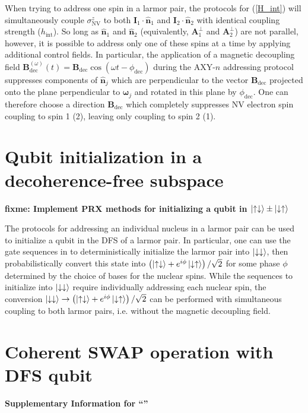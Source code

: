 \documentclass[twocolumn]{revtex4-1}
\renewcommand{\t}{\text} %
\newcommand{\p}[1]{\left(#1\right)} %
\renewcommand{\v}{\bm} %
\newcommand{\uv}[1]{\hat{\v{#1}}} %
\renewcommand{\c}{\cdot} %
\renewcommand{\u}{\uparrow}
\renewcommand{\d}{\downarrow}
\newcommand{\NV}{\t{NV}}
\newcommand{\fixme}[1]{{\bf \color{red} fixme: #1}}
\begin{document}
When trying to address one spin in a larmor pair, the protocols for
(\ref{H_int}) will simultaneously couple $\sigma_\NV^z$ to both
$\v I_1\c\uv n_1$ and $\v I_2\c\uv n_2$ with identical coupling
strength ($h_\t{int}$). So long as $\uv n_1$ and $\uv n_2$
(equivalently, $\v A_1^\perp$ and $\v A_2^\perp$) are not parallel,
however, it is possible to address only one of these spins at a time
by applying additional control fields. In particular, the application
of a magnetic decoupling field
$\v B_\t{dec}^{\p\omega}\p{t}=\v B_\t{dec}\cos\p{\omega
  t-\phi_\t{dec}}$ during the AXY-$n$ addressing protocol suppresses
components of $\uv n_j$ which are perpendicular to the vector
$\v B_\t{dec}$ projected onto the plane perpendicular to $\v\omega_j$
and rotated in this plane by $\phi_\t{dec}$. One can therefore choose
a direction $\v B_\t{dec}$ which completely suppresses NV electron
spin coupling to spin 1 (2), leaving only coupling to spin 2 (1).

\section{Qubit initialization in a decoherence-free subspace}

\fixme{Implement PRX\cite{reiserer2016robust} methods for initializing
  a qubit in $\ket{\u\d}\pm\ket{\d\u}$}

The protocols for addressing an individual nucleus in a larmor pair
can be used to initialize a qubit in the DFS of a larmor pair. In
particular, one can use the gate sequences in
\cite{reiserer2016robust} to deterministically initialize the larmor
pair into $\ket{\d\d}$, then probabilistically convert this state into
$\p{\ket{\u\d}+e^{i\phi}\ket{\d\u}}/\sqrt2$ for some phase $\phi$
determined by the choice of bases for the nuclear spins. While the
sequences to initialize into $\ket{\d\d}$ require individually
addressing each nuclear spin, the conversion
$\ket{\d\d}\to\p{\ket{\u\d}+e^{i\phi}\ket{\d\u}}/\sqrt2$ can be
performed with simultaneous coupling to both larmor pairs,
i.e. without the magnetic decoupling field.

\section{Coherent SWAP operation with DFS qubit}






\pagebreak
\clearpage
\widetext
\makeatletter
\begin{center}
  \large \bf Supplementary Information for ``\@title''
\end{center}
\setcounter{equation}{0}
\setcounter{figure}{0}
\setcounter{table}{0}
\setcounter{page}{1}
\renewcommand{\theequation}{S\arabic{equation}}
\renewcommand{\thefigure}{S\arabic{figure}}
\renewcommand{\bibnumfmt}[1]{[S#1]}
\renewcommand{\citenumfont}[1]{S#1}
\end{document}
